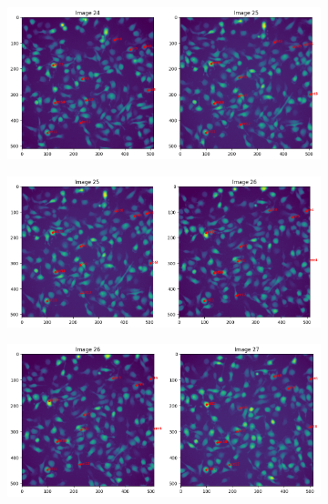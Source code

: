 \documentclass{article}
\begin{document}
\begin{figure}[h!]
    \centering
    \begin{subfigure}[b]{0.5\linewidth}
        \centering
        \includegraphics[width=\linewidth]{Report/RImages/Traces_Growth/trace-b25.png}
        \caption{}
    \end{subfigure}%
    \begin{subfigure}[b]{0.5\linewidth}
        \centering
        \includegraphics[width=\linewidth]{Report/RImages/Traces_Growth/trace-b26.png}
        \caption{}
    \end{subfigure}
    \begin{subfigure}[b]{0.5\linewidth}
        \centering
        \includegraphics[width=\linewidth]{Report/RImages/Traces_Growth/trace-b27.png}

\end{subfigure}
\end{figure}
\end{document}
